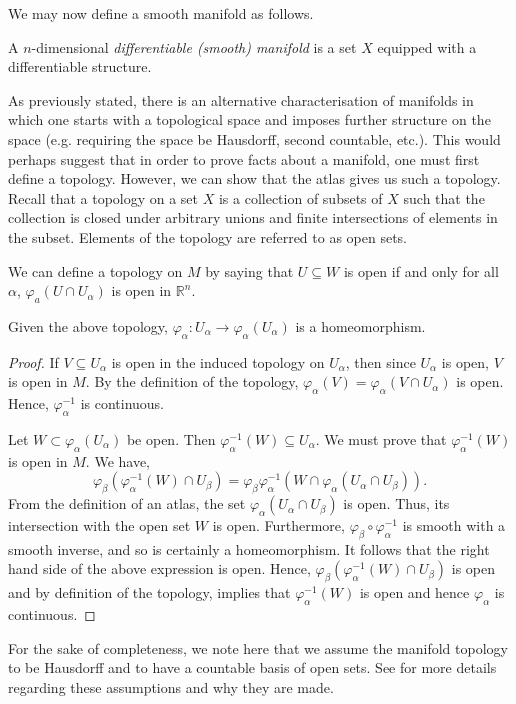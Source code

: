 \documentclass[12pt,a4paper]{article}
\begin{document}
We may now define a smooth manifold as follows.
\begin{definition}
A $n$-dimensional \textit{differentiable (smooth) manifold} is a set $X$ equipped with a differentiable structure.
\end{definition}
As previously stated, there is an alternative characterisation of manifolds in which one starts with a topological space and imposes further structure on the space (e.g. requiring the space be Hausdorff, second countable, etc.). This would perhaps suggest that in order to prove facts about a manifold, one must first define a topology. However, we can show that the atlas gives us such a topology.\\

Recall that a topology on a set $X$ is a collection of subsets of $X$ such that the collection is closed under arbitrary unions and finite intersections of elements in the subset. Elements of the topology are referred to as open sets.

We can define a topology on $M$ by saying that $U\subseteq W$ is open if and only for all $\alpha$, $\varphi_a(U\cap U_\alpha)$ is open in $\mathbb{R}^n$.

\begin{proposition}
Given the above topology, $\varphi_\alpha :U_\alpha\to\varphi_\alpha(U_\alpha)$ is a homeomorphism.
\end{proposition}
\begin{proof}
If $V\subseteq U_\alpha$ is open in the induced topology on $U_\alpha$, then since $U_\alpha$ is open, $V$ is open in $M$. By the definition of the topology, $\varphi_\alpha(V)=\varphi_\alpha(V\cap U_\alpha)$ is open. Hence, $\varphi^{-1}_\alpha$ is continuous.

Let $W\subset\varphi_\alpha(U_\alpha)$ be open. Then $\varphi_\alpha^{-1}(W)\subseteq U_\alpha$. We must prove that $\varphi_\alpha^{-1}(W)$ is open in $M$. We have,
\[
\varphi_\beta(\varphi_\alpha^{-1}(W)\cap U_\beta)=\varphi_\beta\varphi_\alpha^{-1}\left(W\cap\varphi_\alpha(U_\alpha\cap U_\beta)\right).
\]
From the definition of an atlas, the set $\varphi_\alpha(U_\alpha\cap U_\beta)$ is open. Thus, its intersection with the open set $W$ is open. Furthermore, $\varphi_\beta\circ\varphi_\alpha^{-1}$ is smooth with a smooth inverse, and so is certainly a homeomorphism. It follows that the right hand side of the above expression is open. Hence, $\varphi_\beta(\varphi_\alpha^{-1}(W)\cap U_\beta)$ is open and by definition of the topology, implies that $\varphi_\alpha^{-1}(W)$ is open and hence $\varphi_\alpha$ is continuous.  
\end{proof}
For the sake of completeness, we note here that we assume the manifold topology to be Hausdorff and to have a countable basis of open sets. See \cite{MR2766102} for more details regarding these assumptions and why they are made.
\end{document}
